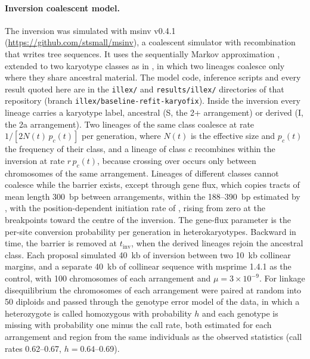\documentclass[11pt]{article}
\begin{document}
\paragraph{Inversion coalescent model.}
The inversion was simulated with msinv v0.4.1 (\url{https://github.com/stsmall/msinv}), a coalescent simulator with recombination that writes tree sequences. It uses the sequentially Markov approximation \citep{mcvean2005smc}, extended to two karyotype classes as in \citet{peischl2013}, in which two lineages coalesce only where they share ancestral material. The model code, inference scripts and every result quoted here are in the \texttt{illex/} and \texttt{results/illex/} directories of that repository (branch \texttt{illex/baseline-refit-karyofix}). Inside the inversion every lineage carries a karyotype label, ancestral (S, the 2+ arrangement) or derived (I, the 2a arrangement). Two lineages of the same class coalesce at rate $1/[2N(t)\,p_c(t)]$ per generation, where $N(t)$ is the effective size and $p_c(t)$ the frequency of their class, and a lineage of class $c$ recombines within the inversion at rate $r\,p_c(t)$, because crossing over occurs only between chromosomes of the same arrangement. Lineages of different classes cannot coalesce while the barrier exists, except through gene flux, which copies tracts of mean length 300~bp between arrangements, within the 188--390~bp estimated by \citet{korunes2019}, with the position-dependent initiation rate of \citet{peischl2013}, rising from zero at the breakpoints toward the centre of the inversion. The gene-flux parameter is the per-site conversion probability per generation in heterokaryotypes. Backward in time, the barrier is removed at $t_\mathrm{inv}$, when the derived lineages rejoin the ancestral class. Each proposal simulated 40~kb of inversion between two 10~kb collinear margins, and a separate 40~kb of collinear sequence with msprime 1.4.1 \citep{baumdicker2022} as the control, with 100 chromosomes of each arrangement and $\mu=3\times10^{-9}$. For linkage disequilibrium the chromosomes of each arrangement were paired at random into 50 diploids and passed through the genotype error model of the data, in which a heterozygote is called homozygous with probability $h$ and each genotype is missing with probability one minus the call rate, both estimated for each arrangement and region from the same individuals as the observed statistics (call rates 0.62--0.67, $h=0.64$--0.69).
\end{document}
